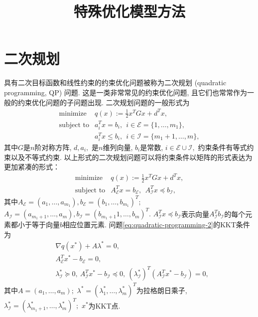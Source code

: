 \documentclass{SBCbookchapter}
\author{}
\title{特殊优化模型方法}
\begin{document}
\maketitle


\section{二次规划}
\label{sec:7.2}

具有二次目标函数和线性约束的约束优化问题被称为二次规划 (quadratic programming, QP) 问题. 这是一类非常常见的约束优化问题, 且它们也常常作为一般的约束优化问题的子问题出现. 二次规划问题的一般形式为
\begin{equation}
\label{eq:quadratic-programming-1}
\begin{array}{cl}
\text{minimize} & q(x) := \frac{1}{2} x^T G x + d^T x, \\
\text{subject to} & a_i^T x = b_i, ~~ i \in \mathcal{E} = \{1, \ldots, m_1\}, \\
& a_i^T x \leqslant b_i, ~~ i \in \mathcal{I} = \{m_1 + 1, \ldots, m\},
\end{array}
\end{equation}
其中$G$是$n$阶对称方阵, $d, a_i,$ 是$n$维列向量, $b_i$是常数, $i \in \mathcal{E} \cup \mathcal{I},$ 约束条件有等式约束以及不等式约束. 以上形式的二次规划问题可以将约束条件以矩阵的形式表达为更加紧凑的形式：
\begin{equation}
\label{eq:quadratic-programming-2}
\begin{array}{cl}
\text{minimize} & q(x) := \frac{1}{2} x^T G x + d^T x, \\
\text{subject to} & A^T_{\mathcal{E}} x = b_{\mathcal{E}}, ~~ A^T_{\mathcal{I}} x \preccurlyeq b_{\mathcal{I}},
\end{array}
\end{equation}
其中$A_{\mathcal{E}} = (a_1, \ldots, a_{m_1}), b_{\mathcal{E}} = (b_1, \ldots, b_{m_1})^T;$ $A_{\mathcal{I}} = (a_{m_1+1}, \ldots, a_m), b_{\mathcal{I}} = (b_{m_1+1}1, \ldots, b_m)^T.$ $A^T_{\mathcal{I}} x \preccurlyeq b_{\mathcal{I}}$表示向量$A^T_{\mathcal{I}} b_{\mathcal{I}}$的每个元素都小于等于向量$b$相应位置元素. 问题\eqref{eq:quadratic-programming-2}的KKT条件为
\begin{equation}
\label{eq:quadratic-programming-kkt}
\begin{aligned}
& \nabla q(x^*) + A \lambda^* = 0, \\
& A^T_{\mathcal{E}} x^* - b_{\mathcal{E}} = 0, \\
& \lambda^*_{\mathcal{I}} \succcurlyeq 0, ~ A_{\mathcal{I}}^T x^* - b_{\mathcal{I}} \preccurlyeq 0, ~ (\lambda^*_{\mathcal{I}})^T (A_{\mathcal{I}}^T x^* - b_{\mathcal{I}}) = 0,
\end{aligned}
\end{equation}
其中$A = (a_1, \ldots, a_m);$ $\lambda^* = (\lambda_1^*, \ldots, \lambda_m^*)^T$为拉格朗日乘子, $\lambda^*_{\mathcal{I}} = (\lambda_{m_1+1}^*, \ldots, \lambda_m^*)^T;$ $x^*$为KKT点.
\end{document}
